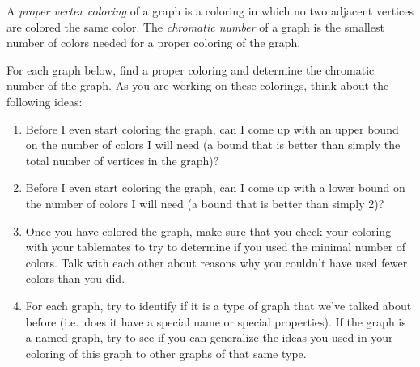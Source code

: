 \documentclass[11pt]{exam}
\begin{document}
A \emph{proper vertex coloring} of a graph is a coloring in which no two adjacent vertices are colored the same color.  The \emph{chromatic number} of a graph is the smallest number of colors needed for a proper coloring of the graph.

For each graph below, find a proper coloring and determine the chromatic number of the graph.  As you are working on these colorings, think about the following ideas:
\begin{enumerate}
\item Before I even start coloring the graph, can I come up with an upper bound on the number of colors I will need (a bound that is better than simply the total number of vertices in the graph)? 

\item Before I even start coloring the graph, can I come up with a lower bound on the number of colors I will need (a bound that is better than simply 2)?  

\item Once you have colored the graph, make sure that you check your coloring with your tablemates to try to determine if you used the minimal number of colors.  Talk with each other about reasons why you couldn't have used fewer colors than you did.
  
\item For each graph, try to identify if it is a type of graph that we've talked about before (i.e.\ does it have a special name or special properties).  If the graph is a named graph, try to see if you can generalize the ideas you used in your coloring of this graph to other graphs of that same type.
\end{enumerate}
\end{document}

